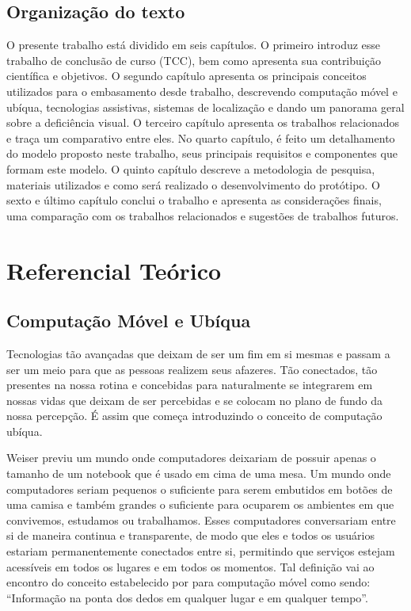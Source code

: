 \documentclass[english,brazilian]{UNISINOSmonografia}
\begin{document}
	\section{Organização do texto}
O presente trabalho está dividido em seis capítulos. O primeiro introduz esse trabalho de conclusão de curso (TCC), bem como apresenta sua contribuição científica e objetivos.
O segundo capítulo apresenta os principais conceitos utilizados para o embasamento desde trabalho, descrevendo computação móvel e ubíqua, tecnologias assistivas, sistemas de localização e dando um panorama geral sobre a deficiência visual.
O terceiro capítulo apresenta os trabalhos relacionados e traça um comparativo entre eles.
No quarto capítulo, é feito um detalhamento do modelo proposto neste trabalho, seus principais requisitos e componentes que formam este modelo.
O quinto capítulo descreve a metodologia de pesquisa, materiais utilizados e como será realizado o desenvolvimento do protótipo.
O sexto e último capítulo conclui o trabalho e apresenta as considerações finais, uma comparação com os trabalhos relacionados e sugestões de trabalhos futuros.

\chapter{Referencial Teórico}

	\section{Computação Móvel e Ubíqua}
Tecnologias tão avançadas que deixam de ser um fim em si mesmas e passam a ser um meio para que as pessoas realizem seus afazeres. Tão conectados, tão presentes na nossa rotina e concebidas para naturalmente se integrarem em nossas vidas que deixam de ser percebidas e se colocam no plano de fundo da nossa percepção. É assim que  começa introduzindo o conceito de computação ubíqua. 

Weiser previu um mundo onde computadores deixariam de possuir apenas o tamanho de um notebook que é usado em cima de uma mesa. Um mundo onde computadores seriam pequenos o suficiente para serem embutidos em botões de uma camisa e também grandes o suficiente para ocuparem os ambientes em que convivemos, estudamos ou trabalhamos. Esses computadores conversariam entre si de maneira continua e transparente, de modo que eles e todos os usuários estariam permanentemente conectados entre si, permitindo que serviços estejam acessíveis em todos os lugares e em todos os momentos. Tal definição vai ao encontro do conceito estabelecido por  para computação móvel como sendo: “Informação na ponta dos dedos em qualquer lugar e em qualquer tempo”.
	
\end{document}
